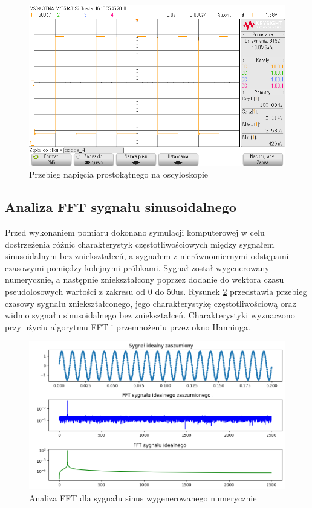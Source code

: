 \begin{figure}[h]
	\centering
		\includegraphics[width=12cm]{rect_max1202_100Hz_osc}
	\caption{Przebieg napięcia prostokątnego na oscyloskopie} 
	\label{fig:rect_max1202_100Hz_osc}
\end{figure}

\subsection{Analiza FFT sygnału sinusoidalnego}

Przed wykonaniem pomiaru dokonano symulacji komputerowej w celu dostrzeżenia różnic charakterystyk częstotliwościowych między sygnałem sinusoidalnym bez zniekształceń, a sygnałem z nierównomiernymi odstępami czasowymi pomiędzy kolejnymi próbkami. 
Sygnał został wygenerowany numerycznie, a następnie zniekształcony poprzez dodanie do wektora czasu pseudolosowych wartości z zakresu od 0 do 50us. Rysunek \ref{fig:sin_fft_ideal} przedstawia przebieg czasowy sygnału zniekształconego, jego charakterystykę częstotliwościową oraz widmo sygnału sinusoidalnego bez zniekształceń. Charakterystyki wyznaczono przy użyciu algorytmu FFT i przemnożeniu przez okno Hanninga.

\begin{figure}[H]

	\centering
		\includegraphics[width=14cm]{sin_fft_ideal}
	\caption{Analiza FFT dla sygnału sinus wygenerowanego numerycznie} 
	\label{fig:sin_fft_ideal}
\end{figure}

